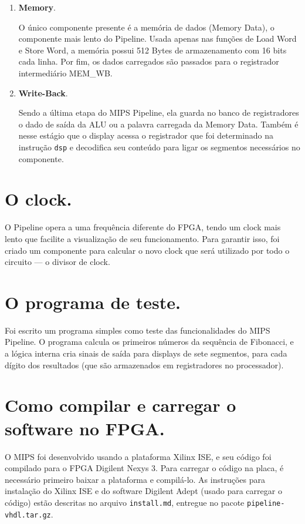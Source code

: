 \documentclass[a4paper, 11pt]{article}
\begin{document}
\begin{enumerate}
    \item \textbf{Memory}.

    O único componente presente é a memória de dados (Memory Data), o componente mais
    lento do Pipeline. Usada apenas nas funções de Load Word e Store Word, a memória
    possui 512 Bytes de armazenamento com 16 bits cada linha. Por fim, os dados carregados
    são passados para o registrador intermediário MEM\_WB.
    
    \item \textbf{Write-Back}.

    Sendo a última etapa do MIPS Pipeline, ela guarda no banco de registradores o
    dado de saída da ALU ou a palavra carregada da Memory Data. Também é nesse estágio
    que o display acessa o registrador que foi determinado na instrução \texttt{dsp}
    e decodifica seu conteúdo para ligar os segmentos necessários no componente.
\end{enumerate}

\section{O clock.}
    O Pipeline opera a uma frequência diferente do FPGA, tendo um clock mais lento
    que facilite a visualização de seu funcionamento. Para garantir isso, foi criado
    um componente para calcular o novo clock que será utilizado por todo o circuito ---
    o divisor de clock.

\section{O programa de teste.}
    Foi escrito um programa simples como teste das funcionalidades do MIPS Pipeline. O 
    programa calcula os primeiros números da sequência de Fibonacci, e a lógica interna
    cria sinais de saída para displays de sete segmentos, para cada dígito dos resultados
    (que são armazenados em registradores no processador).

\section{Como compilar e carregar o software no FPGA.}
    O MIPS foi desenvolvido usando a plataforma Xilinx ISE, e seu código foi compilado
    para o FPGA Digilent Nexys 3. Para carregar o código na placa, é necessário primeiro
    baixar a plataforma e compilá-lo. As instruções para instalação do Xilinx ISE e do
    software Digilent Adept (usado para carregar o código) estão descritas no arquivo
    \texttt{install.md}, entregue no pacote \texttt{pipeline-vhdl.tar.gz}.
\end{document}
